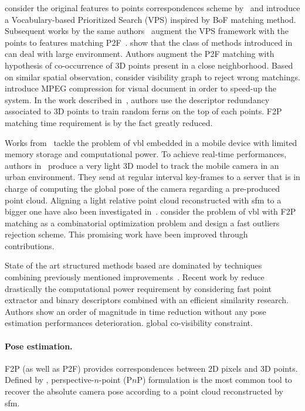 \citet{Sattler2011} consider the original features to points correspondences scheme by~\citep{Irschara2009} and introduce a Vocabulary-based Prioritized Search (VPS) inspired by BoF matching method. Subsequent works by the same authors~\citep{Sattler2012} augment the VPS framework with the points to features matching P2F~\citep{Li2010}. \citet{Li2012} show that the class of methods introduced in~\citep{Irschara2009,Li2010} can deal with large environment. Authors augment the P2F matching with hypothesis of co-occurrence of 3D points present in a close neighborhood. Based on similar spatial observation, \citet{Sattler2015} consider visibility graph to reject wrong matchings. \citet{Heisterklaus2014} introduce MPEG compression for visual document in order to speed-up the system. In the work described in~\citep{Donoser2014}, authors use the descriptor redundancy associated to 3D points to train random ferns on the top of each points. F2P matching time requirement is by the fact greatly reduced. 

Works from~\citep{Middelberg2014,Lynen2015} tackle the problem of \ac{vbl} embedded in a mobile device with limited memory storage and computational power. To achieve real-time performances, authors in~\citep{Middelberg2014} produce a very light 3D model to track the mobile camera in an urban environment. They send at regular interval key-frames to a server that is in charge of computing the global pose of the camera regarding a pre-produced point cloud. Aligning a light relative point cloud reconstructed with \ac{sfm} to a bigger one have also been investigated in~\citep{Lu2015}. \citet{Svarm2014} consider the problem of \ac{vbl} with F2P matching as a combinatorial optimization problem and design a fast outliers rejection scheme. This promising work have been improved through~\citep{Zeisl2015,Svarm2016} contributions.

State of the art structured methods based are dominated by techniques combining previously mentioned improvements~\citep{Sattler2016a}. Recent work by \citet{Feng2016a} reduce drastically the computational power requirement by considering fast point extractor and binary descriptors combined with an efficient similarity research. Authors show an order of magnitude in time reduction without any pose estimation performances deterioration. \citep{Liu2017a} global co-visibility constraint.

\paragraph{Pose estimation.}
\label{para:pose_estimation}
F2P (as well as P2F) provides correspondences between 2D pixels and 3D points. Defined by \citet{Hartley2003}, perspective-$n$-point (P$n$P) formulation is the most common tool to recover the absolute camera pose according to a point cloud reconstructed by \ac{sfm}.

